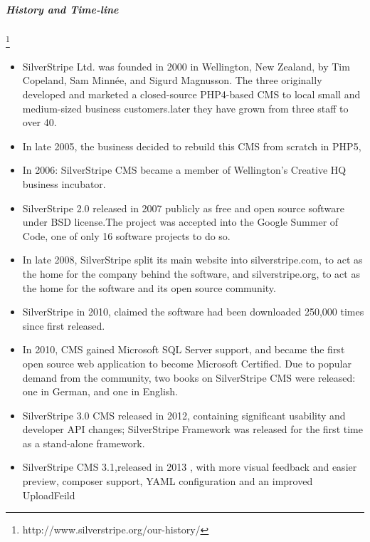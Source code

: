 \documentclass[11pt]{article} %
\begin{document}
  \subparagraph{History and Time-line}\footnote{http://www.silverstripe.org/our-history/}
\begin{itemize}
\item SilverStripe Ltd. was founded in 2000 in Wellington, New Zealand, by Tim Copeland, Sam Minnée, and Sigurd Magnusson. The three originally developed and marketed a closed-source PHP4-based CMS to local small and medium-sized business customers.later they have grown from three staff to over 40.
\item In late 2005, the business decided to rebuild this CMS from scratch in PHP5,
\item In 2006: SilverStripe CMS became a member of Wellington’s Creative HQ business incubator.
\item  SilverStripe 2.0 released in 2007 publicly as free and open source software under BSD license.The project was accepted into the Google Summer of Code, one of only 16 software projects to do so.
\item In late 2008, SilverStripe split its main website into silverstripe.com, to act as the home for the company behind the software, and silverstripe.org, to act as the home for the software and its open source community.
\item SilverStripe in 2010,  claimed the software had been downloaded 250,000 times since first released.
\item  In 2010,  CMS gained Microsoft SQL Server support, and became the first open source web application to become Microsoft Certified. Due to popular demand from the community, two books on SilverStripe CMS were released: one in German, and one in English.

\item SilverStripe 3.0 CMS  released in 2012, containing significant usability and developer API changes; SilverStripe Framework was released for the first time as a stand-alone framework.
\item SilverStripe CMS 3.1,released in 2013 , with more visual feedback and easier preview, composer support, YAML configuration and an improved UploadFeild


\end{itemize}
\end{document}
